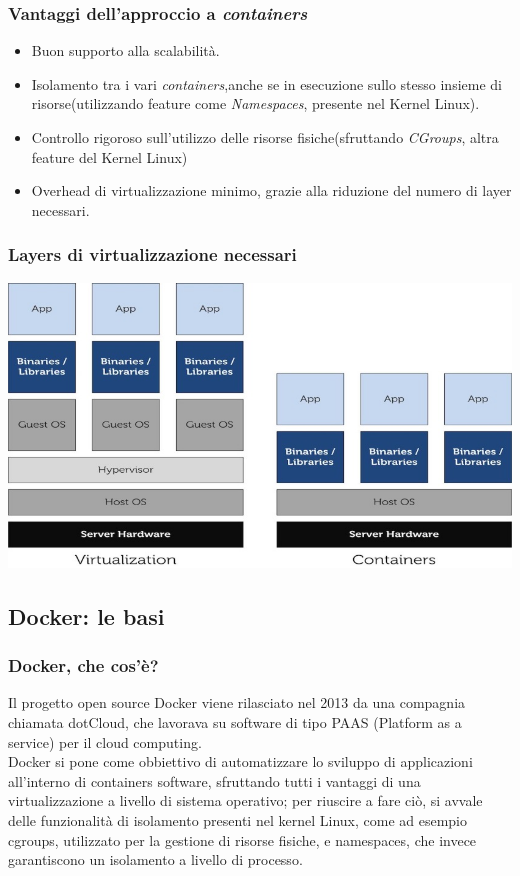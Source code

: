 \documentclass{beamer}
\begin{document}

\begin{frame}
\frametitle{Vantaggi dell'approccio a  \textit{containers}}
\begin{itemize}
\item Buon supporto alla scalabilità.
\item Isolamento tra i vari  \textit{containers},anche se in esecuzione sullo stesso insieme di risorse(utilizzando feature come  \textit{Namespaces}, presente nel Kernel Linux).
\item Controllo rigoroso sull'utilizzo delle risorse fisiche(sfruttando \textit{CGroups}, altra feature del Kernel Linux)
\item Overhead di virtualizzazione minimo, grazie alla riduzione del numero di layer necessari.
\end{itemize}
\end{frame}

\begin{frame}
\frametitle{Layers di virtualizzazione necessari}
\includegraphics[width=\textwidth]{pic1}
\end{frame}


\subsection{Docker: le basi} %

\begin{frame}
\frametitle{Docker, che cos'è?}
Il progetto open source Docker viene rilasciato nel 2013 da una compagnia chiamata dotCloud, che lavorava su software di tipo PAAS (Platform as a service) per il cloud computing.\\
Docker si pone come obbiettivo di automatizzare lo sviluppo di applicazioni all’interno di containers software, sfruttando tutti i vantaggi di una virtualizzazione a livello di sistema operativo; per riuscire a fare ciò, si avvale delle funzionalità di isolamento presenti nel kernel Linux, come ad esempio cgroups, utilizzato per la gestione di risorse fisiche, e namespaces, che invece garantiscono un isolamento a livello di processo.
\end{frame}
\end{document}

